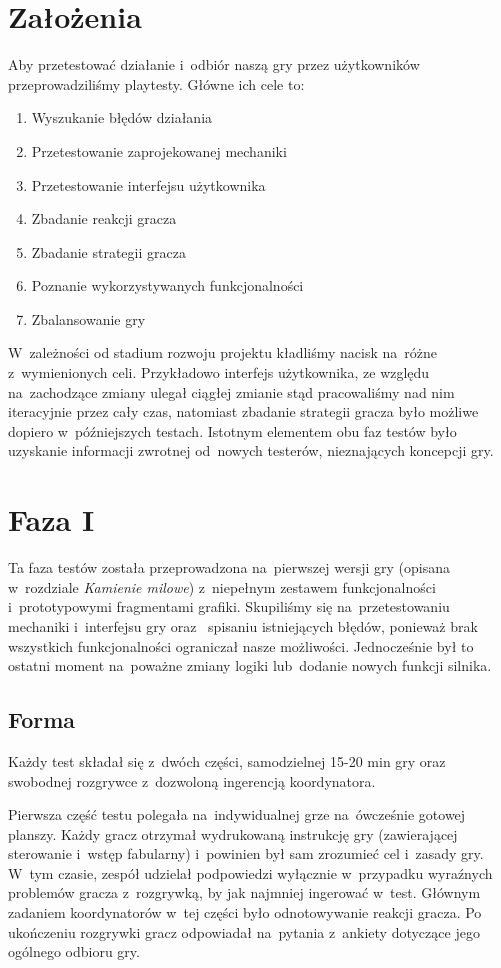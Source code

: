 \documentclass[licencjacka]{pracamgr}
\begin{document}
  \section{Założenia}
    Aby przetestować działanie i~odbiór naszą gry przez użytkowników przeprowadziliśmy playtesty. Główne ich cele to:
    \begin{enumerate}
    \item Wyszukanie błędów działania
    \item Przetestowanie zaprojekowanej mechaniki
    \item Przetestowanie interfejsu użytkownika
    \item Zbadanie reakcji gracza
    \item Zbadanie strategii gracza
    \item Poznanie wykorzystywanych funkcjonalności
    \item Zbalansowanie gry
    \end{enumerate}
    W~zależności od stadium rozwoju projektu kładliśmy nacisk na~różne z~wymienionych celi. Przykładowo interfejs użytkownika,
    ze względu na~zachodzące zmiany ulegał ciągłej zmianie stąd pracowaliśmy nad nim iteracyjnie przez cały czas, natomiast
    zbadanie strategii gracza było możliwe dopiero w~późniejszych testach. Istotnym elementem obu faz testów było uzyskanie
    informacji zwrotnej od~nowych testerów, nieznających koncepcji gry.

  \section{Faza I}
    Ta faza testów została przeprowadzona na~pierwszej wersji gry (opisana w~rozdziale \emph{Kamienie milowe})
    z~niepełnym zestawem funkcjonalności i~prototypowymi fragmentami grafiki. Skupiliśmy się na~przetestowaniu mechaniki
    i~interfejsu gry oraz~ spisaniu istniejących błędów, ponieważ brak wszystkich funkcjonalności ograniczał nasze możliwości.
    Jednocześnie był to ostatni moment na~poważne zmiany logiki lub~dodanie nowych funkcji silnika.

    \subsection{Forma}
      Każdy test składał  się z~dwóch części, samodzielnej 15-20 min gry
      oraz~ swobodnej rozgrywce z~dozwoloną ingerencją koordynatora.

      Pierwsza część testu polegała na~indywidualnej grze na~ówcześnie gotowej planszy.
      Każdy gracz otrzymał wydrukowaną instrukcję gry (zawierającej sterowanie i~wstęp fabularny)
      i~powinien był sam zrozumieć cel i~zasady gry. W~tym czasie, zespół udzielał podpowiedzi
      wyłącznie w~przypadku wyraźnych problemów gracza z~rozgrywką, by jak najmniej ingerować w~test.
      Głównym zadaniem koordynatorów w~tej części było odnotowywanie reakcji gracza.
      Po ukończeniu rozgrywki gracz odpowiadał na~pytania z~ankiety dotyczące jego ogólnego odbioru gry.
\end{document}
